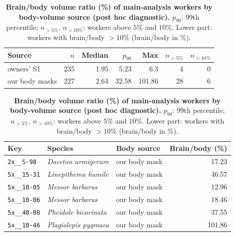 \begin{table}[htbp]
\centering
\caption[Brain/body volume ratio by body-volume source]{\textbf{Brain/body volume ratio (\%) of main-analysis workers by body-volume source (post hoc diagnostic).} $p_{99}$: 99th percentile; $n_{>5\%}$, $n_{>10\%}$: workers above $5\%$ and $10\%$.
Lower part: workers with brain/body $> 10\%$ (brain/body in \%).}
\label{tab:S9}
\footnotesize
\begin{tabular}{@{}lrrrrrr@{}}
\toprule
Source & $n$ & Median & $p_{99}$ & Max & $n_{>5\%}$ & $n_{>10\%}$ \\
\midrule
owners' S1 & 235 & 1.95 & 5.23 & 6.3 & 4 & 0 \\
our body masks & 227 & 2.64 & 32.58 & 101.86 & 28 & 6 \\
\bottomrule
\end{tabular}

\bigskip
\begin{tabular}{@{}lllr@{}}
\toprule
Key & Species & Body source & Brain/body (\%) \\
\midrule
\texttt{2x\_\_S-98} & \emph{Daceton armigerum} & our body mask & 17.23 \\
\texttt{5x\_\_15-31} & \emph{Linepithema humile} & our body mask & 46.57 \\
\texttt{5x\_\_10-05} & \emph{Messor barbarus} & our body mask & 12.96 \\
\texttt{5x\_\_10-06} & \emph{Messor barbarus} & our body mask & 18.46 \\
\texttt{5x\_\_40-08} & \emph{Pheidole bicarinata} & our body mask & 37.55 \\
\texttt{5x\_\_10-46} & \emph{Plagiolepis pygmaea} & our body mask & 101.86 \\
\bottomrule
\end{tabular}
\end{table}
